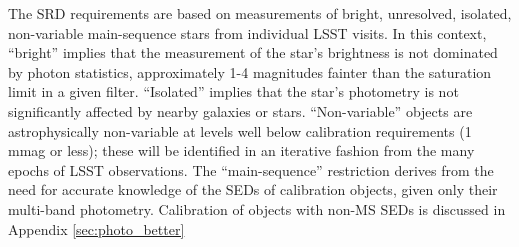 \documentclass[12pt,preprint]{aastex}
\begin{document}
The SRD requirements are based on
measurements of bright, unresolved, isolated, non-variable main-sequence stars
from individual LSST visits. 
In this context, ``bright'' implies that the
measurement of the star's brightness is not dominated by photon
statistics, approximately 1-4 magnitudes fainter than the saturation
limit in a given filter. ``Isolated'' implies that the star's
photometry is not significantly affected by nearby galaxies or stars. 
``Non-variable'' objects are astrophysically non-variable at levels
well below calibration requirements (1 mmag or less); these will
be identified in an iterative fashion from the many epochs of LSST
observations.  The ``main-sequence'' restriction derives from the need
for accurate knowledge of the SEDs of calibration objects, given
only their multi-band photometry.  Calibration of objects with non-MS
SEDs is discussed in Appendix \ref{sec:photo_better}
\end{document}
